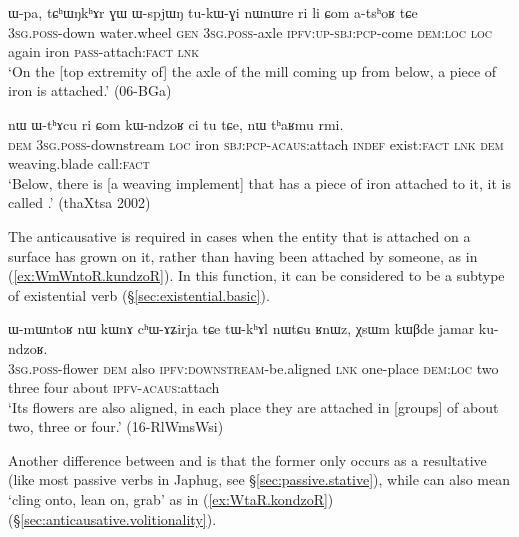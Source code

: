 \begin{exe}
\ex \label{ex:Com.atshoR}
 \gll ɯ-pa, tɕʰɯŋkʰɤr ɣɯ ɯ-spjɯŋ tu-kɯ-ɣi nɯnɯre ri li ɕom a-tsʰoʁ tɕe \\
  \textsc{3sg}.\textsc{poss}-down water.wheel \textsc{gen} \textsc{3sg}.\textsc{poss}-axle \textsc{ipfv}:\textsc{up}-\textsc{sbj}:\textsc{pcp}-come \textsc{dem}:\textsc{loc} \textsc{loc} again iron \textsc{pass}-attach:\textsc{fact} \textsc{lnk} \\
\glt `On the [top extremity of] the axle of the mill coming up from below, a piece of iron is attached.' (06-BGa) 	
\end{exe}

\begin{exe}
\ex \label{ex:Com.kWndzoR}
 \gll nɯ ɯ-tʰɤcu ri ɕom kɯ-ndzoʁ ci tu tɕe, nɯ tʰaʁmu rmi. \\
 \textsc{dem} \textsc{3sg}.\textsc{poss}-downstream \textsc{loc} iron \textsc{sbj}:\textsc{pcp}-\textsc{acaus}:attach \textsc{indef} exist:\textsc{fact} \textsc{lnk} \textsc{dem} weaving.blade call:\textsc{fact} \\
 \glt `Below, there is [a weaving implement] that has a piece of iron attached to it, it is called .' (thaXtsa 2002)
\end{exe}

The anticausative  is required in cases when the entity that is attached on a surface has grown on it, rather than having been attached by someone, as in (\ref{ex:WmWntoR.kundzoR}). In this function, it can be considered to be a subtype of existential verb (§\ref{sec:existential.basic}).

\begin{exe}
\ex \label{ex:WmWntoR.kundzoR}
 \gll ɯ-mɯntoʁ nɯ kɯnɤ cʰɯ-ɤʑirja tɕe tɯ-kʰɤl nɯtɕu ʁnɯz, χsɯm kɯβde jamar ku-ndzoʁ. \\
 \textsc{3sg}.\textsc{poss}-flower \textsc{dem} also \textsc{ipfv}:\textsc{downstream}-be.aligned \textsc{lnk} one-place \textsc{dem}:\textsc{loc} two three four about \textsc{ipfv}-\textsc{acaus}:attach \\
 \glt `Its flowers are also aligned, in each place they are attached in [groups] of about two, three or four.' (16-RlWmsWsi)
\end{exe}

Another difference between  and  is that the former only occurs as a resultative (like most passive verbs in Japhug, see §\ref{sec:passive.stative}), while  can also mean `cling onto, lean on, grab' as in (\ref{ex:WtaR.kondzoR}) (§\ref{sec:anticausative.volitionality}).

